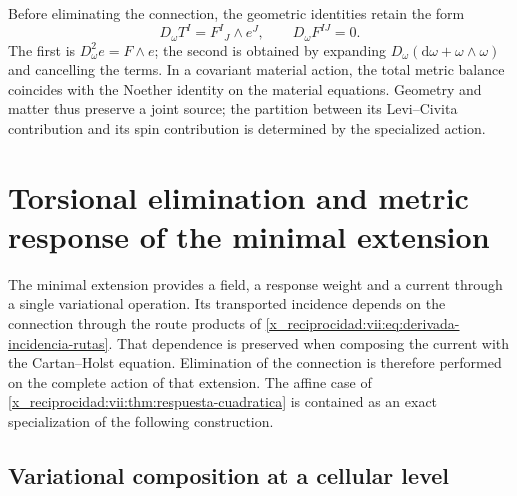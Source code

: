 \begin{HMTCompactSection}
Before eliminating the connection, the geometric identities retain
the form
\begin{equation}
 D_\omega T^I=F^I{}_{J}\wedge e^J,\qquad D_\omega F^{IJ}=0.
 \label{x_reciprocidad:vii:eq:bianchi-cartan}
\end{equation}
The first is \(D_\omega^2e=F\wedge e\); the second is obtained by expanding \(D_\omega(\mathrm d\omega+\omega\wedge\omega)\) and cancelling the terms. In a covariant material action, the total metric balance coincides with the Noether identity on the material equations. Geometry and matter thus preserve a joint source; the partition between its Levi--Civita contribution and its spin contribution is determined by the specialized action.


\end{HMTCompactSection}


\chapter{Torsional elimination and metric response of the minimal extension}
\label{x_reciprocidad:vii:sec:eliminacion-torsional-no-lineal}

The minimal extension provides a field, a response weight and a
current through a single variational operation. Its transported
incidence depends on the connection through the route products of
\eqref{x_reciprocidad:vii:eq:derivada-incidencia-rutas}. That dependence is preserved when
composing the current with the Cartan--Holst equation. Elimination
of the connection is therefore performed on the complete action of that
extension. The affine case of
\ref{x_reciprocidad:vii:thm:respuesta-cuadratica} is contained as an
exact specialization of the following construction.

\section{Variational composition at a cellular level}
\label{x_reciprocidad:vii:subsec:composicion-torsional-celular}

